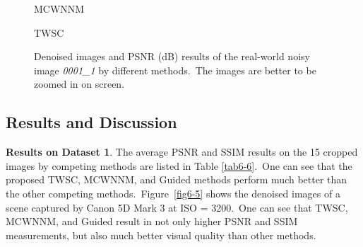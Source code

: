 \begin{figure}[ht!]
{\begin{minipage}[t]{0.19\textwidth}
{\scriptsize MCWNNM}
\end{minipage}
\begin{minipage}[t]{0.19\textwidth}
\centering
{}
{\footnotesize TWSC}
\end{minipage}
}
    \caption{Denoised images and PSNR (dB) results of the real-world noisy image \textsl{0001\_1} \cite{dnd2017} by different methods.\ The images are better to be zoomed in on screen.}
    \label{fig6-6}
\end{figure}


\subsection{Results and Discussion}

\textbf{Results on Dataset 1}. The average PSNR and SSIM results on the 15 cropped images by competing methods are listed in Table \ref{tab6-6}.\ One can see that the proposed TWSC, MCWNNM, and Guided methods perform much better than the other competing methods.\ Figure\ \ref{fig6-5} shows the denoised images of a scene captured by Canon 5D Mark 3 at ISO = 3200.\ One can see that TWSC, MCWNNM, and Guided result in not only higher PSNR and SSIM measurements, but also much better visual quality than other methods.

